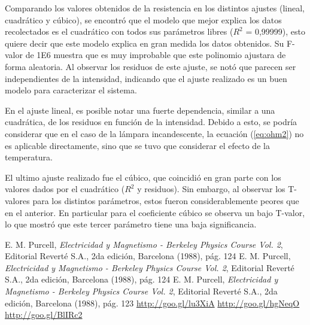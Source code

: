 \documentclass[twoside,twocolumn,a4paper]{article}
\begin{document}
Comparando los valores obtenidos de la resistencia en los distintos ajustes (lineal, cuadr\'atico y c\'ubico), se encontr\'o que el modelo que mejor explica los datos recolectados es el cuadr\'atico con todos sus par\'ametros libres ($R^2$ = 0,99999), esto quiere decir que este modelo explica en gran medida los datos obtenidos. Su F-valor de 1E6 muestra que es muy improbable que este polinomio ajustara de forma aleatoria. Al observar los residuos de este ajuste, se not\'o que parecen ser independientes de la intensidad, indicando que el ajuste realizado es un buen modelo para caracterizar el sistema.
\par

En el ajuste lineal, es posible notar una fuerte dependencia, similar a una cuadr\'atica, de los residuos en funci\'on de la intensidad. Debido a esto, se podr\'ia considerar que en el caso de la l\'ampara incandescente, la ecuaci\'on (\ref{eq:ohm2}) no es aplicable directamente, sino que se tuvo que considerar el efecto de la temperatura.

El ultimo ajuste realizado fue el c\'ubico, que coincidi\'o en gran parte con los valores dados por el cuadr\'atico ($R^2$ y residuos). Sin embargo, al observar los T-valores para los distintos par\'ametros, estos fueron considerablemente peores que en el anterior. En particular para el coeficiente c\'ubico se observa un bajo T-valor, lo que mostr\'o que este tercer par\'ametro tiene una baja significancia.


\begin{thebibliography}{99} %

 E. M. Purcell, \textit{Electricidad y Magnetismo - Berkeley Physics Course Vol. 2}, Editorial Revert\'e S.A., 2da edici\'on, Barcelona (1988), p\'ag. 124
 E. M. Purcell, \textit{Electricidad y Magnetismo - Berkeley Physics Course Vol. 2}, Editorial Revert\'e S.A., 2da edici\'on, Barcelona (1988), p\'ag. 124
 E. M. Purcell, \textit{Electricidad y Magnetismo - Berkeley Physics Course Vol. 2}, Editorial Revert\'e S.A., 2da edici\'on, Barcelona (1988), p\'ag. 123
 \url{http://goo.gl/lu3XiA}
 \url{http://goo.gl/hgNeqO}
 \url{http://goo.gl/BlIRc2}
 
\end{thebibliography}

\end{document}
